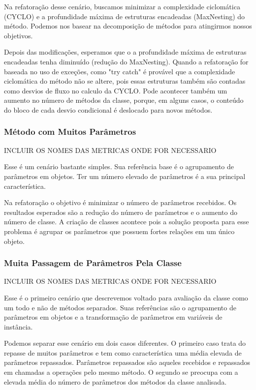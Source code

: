 	Na refatoração desse cenário, buscamos minimizar a complexidade ciclomática (CYCLO) e a profundidade máxima de estruturas encadeadas (MaxNesting) do método. Podemos nos basear na decomposição de métodos para atingirmos nossos objetivos.
	
	Depois das modificações, esperamos que o a profundidade máxima de estruturas encadeadas tenha diminuído (redução do MaxNesting). Quando a refatoração for baseada no uso de exceções, como "try catch" é provável que a complexidade ciclomática do método não se altere, pois essas estruturas também são contadas como desvios de fluxo no calculo da CYCLO. Pode acontecer também um aumento no número de métodos da classe, porque, em alguns casos, o conteúdo do bloco de cada desvio condicional é deslocado para novos métodos. 


\subsubsection{Método com Muitos Parâmetros}
	INCLUIR OS NOMES DAS METRICAS ONDE FOR NECESSARIO

	Esse é um cenário bastante simples. Sua referência base é o agrupamento de parâmetros em objetos. Ter um número elevado de parâmetros é a sua principal característica.
	
	Na refatoração o objetivo é minimizar o número de parâmetros recebidos. Os resultados esperados são a redução do número de parâmetros e o aumento do número de classe. A criação de classes acontece pois a solução proposta para esse problema é agrupar os parâmetros que possuem fortes relações em um único objeto.
	


\subsubsection{Muita Passagem de Parâmetros Pela Classe}
	INCLUIR OS NOMES DAS METRICAS ONDE FOR NECESSARIO
	
	Esse é o primeiro cenário que descrevemos voltado para avaliação da classe como um todo e não de métodos separados. Suas referências são o agrupamento de parâmetros em objetos e a transformação de parâmetros em variáveis de instância.
	
	Podemos separar esse cenário em dois casos diferentes. O primeiro caso trata do repasse de muitos parâmetros e tem como característica uma média elevada de parâmetros repassados. Parâmetros repassados são aqueles recebidos e repassados em chamadas a operações pelo mesmo método. O segundo se preocupa com a elevada média do número de parâmetros dos métodos da classe analisada.
	
